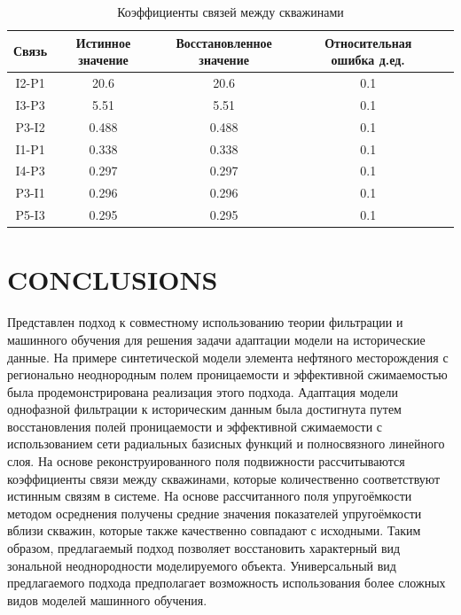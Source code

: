 \documentclass{article}
\begin{document}
	\begin{table}[h!]
	\caption{Коэффициенты связей между скважинами}	
	\label{tabl:connection}	
	\begin{center}
		\begin{tabular}{c|c|c|c|c}
			\hline
			Связь & Истинное значение & Восстановленное значение & Относительная ошибка д.ед. \\
			\hline
				I2-P1 & 20.6 & 20.6 & 0.1 \\ 
				I3-P3 & 5.51 & 5.51 & 0.1 \\ 
				P3-I2 & 0.488 & 0.488 & 0.1 \\ 
				I1-P1 & 0.338 & 0.338 & 0.1 \\ 
				I4-P3 & 0.297 & 0.297 & 0.1 \\ 
				P3-I1 & 0.296 & 0.296 & 0.1 \\ 
				P5-I3 & 0.295 & 0.295 & 0.1 \\ 
			\hline
			
		\end{tabular}
	\end{center}
\end{table}


\section{CONCLUSIONS}

Представлен подход к совместному использованию теории фильтрации и машинного обучения для решения задачи адаптации модели на исторические данные. На примере синтетической модели элемента нефтяного месторождения с регионально неоднородным полем проницаемости и эффективной сжимаемостью была продемонстрирована реализация этого подхода. Адаптация модели однофазной фильтрации к историческим данным была достигнута путем восстановления полей проницаемости и эффективной сжимаемости с использованием сети радиальных базисных функций и полносвязного линейного слоя. На основе реконструированного поля подвижности рассчитываются коэффициенты связи между скважинами, которые количественно соответствуют истинным связям в системе. На основе рассчитанного поля упругоёмкости методом осреднения получены средние значения показателей упругоёмкости вблизи скважин, которые также качественно совпадают с исходными. Таким образом, предлагаемый подход позволяет восстановить характерный вид зональной неоднородности моделируемого объекта. Универсальный вид предлагаемого подхода предполагает возможность использования более сложных видов моделей машинного обучения.
\end{document}
